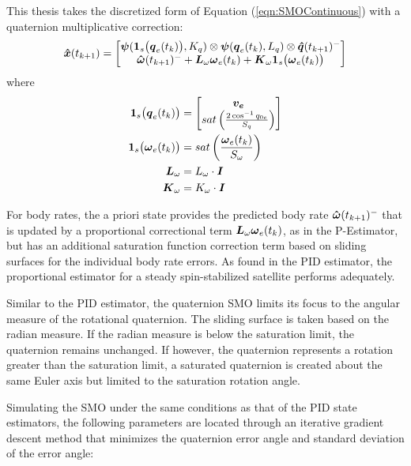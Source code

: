 This thesis takes the discretized form of Equation (\ref{eqn:SMOContinuous}) with a quaternion multiplicative correction:
\begin{equation}
  \boldsymbol{\hat{x}}(t_{k+1}) = \begin{bmatrix} \boldsymbol{\psi} (\boldsymbol{1}_s\big(\boldsymbol{q}_{e}(t_k)\big), K_q) \otimes \boldsymbol{\psi}(\boldsymbol{q}_e(t_{k}), L_{q})  \otimes \boldsymbol{\hat{q}}(t_{k+1})^- \\
  \boldsymbol{\hat{\omega}}(t_{k+1})^- + \boldsymbol{L}_{\omega} \boldsymbol{\omega}_e(t_{k}) + \boldsymbol{K}_{\omega}\boldsymbol{1}_s \big(\boldsymbol{\omega}_e(t_{k}) \big) \end{bmatrix}
  \label{eqn:SMOEstimatorwithPredictionUnforcedMotion}
\end{equation}
where
\begin{subequations}
  \begin{align}
    \boldsymbol{1}_s\big(\boldsymbol{q}_{e}(t_k) \big) &= \begin{bmatrix} \boldsymbol{v_e} \\ sat\left( \frac{2\cos^{-1} q_{0e} }{S_{q}} \right) \end{bmatrix} \\
    \boldsymbol{1}_s \big(\boldsymbol{\omega}_e(t_{k}) \big) &= sat\left( \frac{\boldsymbol{\omega}_e(t_{k})}{S_{\omega}} \right) \\
    \boldsymbol{L}_{\omega} &= L_\omega \cdot \boldsymbol{I} \\
    \boldsymbol{K}_{\omega} &= K_\omega \cdot \boldsymbol{I}
  \end{align}
\end{subequations}

For body rates, the a priori state provides the predicted body rate $\boldsymbol{\hat{\omega}}(t_{k+1})^-$ that is updated by a proportional correctional term $\boldsymbol{L}_{\omega} \boldsymbol{\omega}_e(t_{k})$, as in the P-Estimator, but has an additional saturation function correction term based on sliding surfaces for the individual body rate errors.  As found in the PID estimator, the proportional estimator for a steady spin-stabilized satellite performs adequately.

Similar to the PID estimator, the quaternion SMO limits its focus to the angular measure of the rotational quaternion.  The sliding surface is taken based on the radian measure.  If the radian measure is below the saturation limit, the quaternion remains unchanged.  If however, the quaternion represents a rotation greater than the saturation limit, a saturated quaternion is created about the same Euler axis but limited to the saturation rotation angle.

Simulating the SMO under the same conditions as that of the PID state estimators, the following parameters are located through an iterative gradient descent method that minimizes the quaternion error angle and standard deviation of the error angle:

